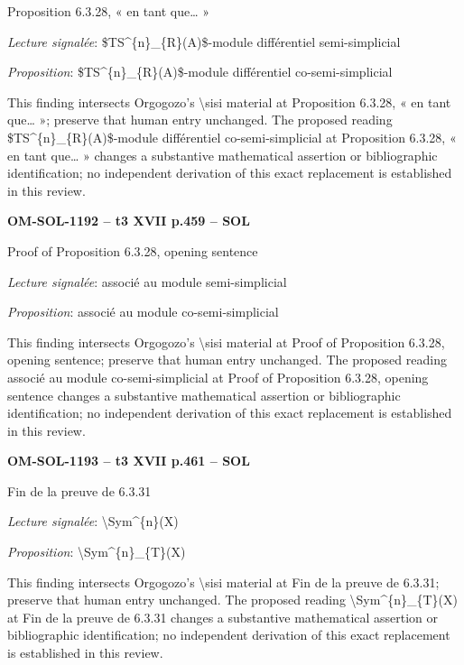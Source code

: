 Proposition 6.3.28, « en tant que… »\par
\emph{Lecture signalée}: \$TS\textasciicircum{}\{n\}\_\{R\}(A)\$-module différentiel semi-simplicial\par
\emph{Proposition}: \$TS\textasciicircum{}\{n\}\_\{R\}(A)\$-module différentiel co-semi-simplicial\par
This finding intersects Orgogozo's \textbackslash{}sisi material at Proposition 6.3.28, « en tant que… »; preserve that human entry unchanged. The proposed reading \$TS\textasciicircum{}\{n\}\_\{R\}(A)\$-module différentiel co-semi-simplicial at Proposition 6.3.28, « en tant que… » changes a substantive mathematical assertion or bibliographic identification; no independent derivation of this exact replacement is established in this review.\par
\par\noindent\textbf{OM-SOL-1192 -- t3 XVII p.459 -- SOL}\par
Proof of Proposition 6.3.28, opening sentence\par
\emph{Lecture signalée}: associé au module semi-simplicial\par
\emph{Proposition}: associé au module co-semi-simplicial\par
This finding intersects Orgogozo's \textbackslash{}sisi material at Proof of Proposition 6.3.28, opening sentence; preserve that human entry unchanged. The proposed reading associé au module co-semi-simplicial at Proof of Proposition 6.3.28, opening sentence changes a substantive mathematical assertion or bibliographic identification; no independent derivation of this exact replacement is established in this review.\par
\par\noindent\textbf{OM-SOL-1193 -- t3 XVII p.461 -- SOL}\par
Fin de la preuve de 6.3.31\par
\emph{Lecture signalée}: \textbackslash{}Sym\textasciicircum{}\{n\}(X)\par
\emph{Proposition}: \textbackslash{}Sym\textasciicircum{}\{n\}\_\{T\}(X)\par
This finding intersects Orgogozo's \textbackslash{}sisi material at Fin de la preuve de 6.3.31; preserve that human entry unchanged. The proposed reading \textbackslash{}Sym\textasciicircum{}\{n\}\_\{T\}(X) at Fin de la preuve de 6.3.31 changes a substantive mathematical assertion or bibliographic identification; no independent derivation of this exact replacement is established in this review.\par
